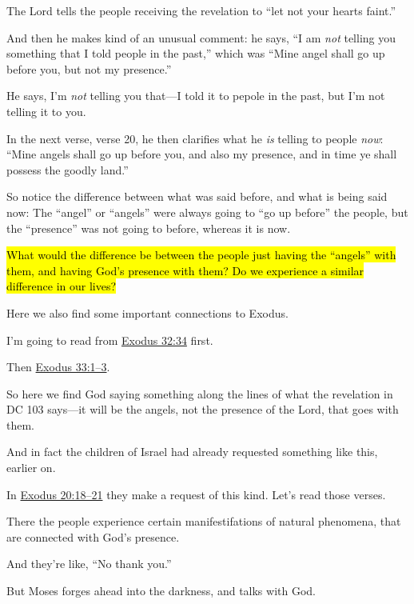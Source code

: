 \begin{compactitem}
\begin{compactitem}
						\begin{compactitem}
							\item The Lord tells the people receiving the revelation to ``let not your hearts faint.''
							\item And then he makes kind of an unusual comment: he says, ``I am \textit{not} telling you something that I told people in the past,'' which was ``Mine angel shall go up before you, but not my presence.''
							\item He says, I'm \textit{not} telling you that---I told it to pepole in the past, but I'm not telling it to you.
							\item In the next verse, verse 20, he then clarifies what he \textit{is} telling to people \textit{now}: ``Mine angels shall go up before you, and also my presence, and in time ye shall possess the goodly land.''
							\item So notice the difference between what was said before, and what is being said now: The ``angel'' or ``angels'' were always going to ``go up before'' the people, but the ``presence'' was not going to before, whereas it is now.
							\item \hl{What would the difference be between the people just having the ``angels'' with them, and having God's presence with them? Do we experience a similar difference in our lives?}
							\item Here we also find some important connections to Exodus.
								\begin{compactitem}
									\item I'm going to read from \hyperref[EXODUS-32-34]{Exodus 32:34} first.
									\item Then \hyperref[EXODUS-33-1]{Exodus 33:1--3}.
									\item So here we find God saying something along the lines of what the revelation in DC 103 says---it will be the angels, not the presence of the Lord, that goes with them.
									\item And in fact the children of Israel had already requested something like this, earlier on.
									\item In \hyperref[EXODUS-20-18]{Exodus 20:18--21} they make a request of this kind. Let's read those verses.
									\item There the people experience certain manifestifations of natural phenomena, that are connected with God's presence.
									\item And they're like, ``No thank you.''
									\item But Moses forges ahead into the darkness, and talks with God.

\end{compactitem}
\end{compactitem}
\end{compactitem}
\end{compactitem}
